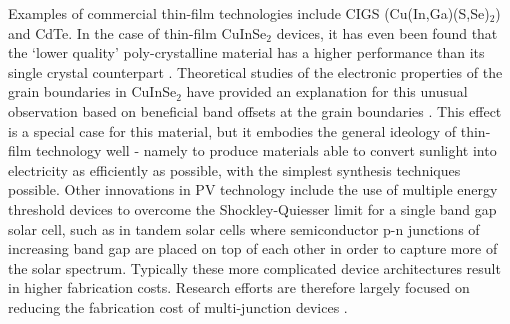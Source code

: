 \documentclass[11pt, twoside]{report}
\begin{document}
Examples of commercial thin-film technologies include CIGS (Cu(In,Ga)(S,Se)$_2$) and CdTe. 
In the case of thin-film CuInSe$_2$ devices, it has even been found that the `lower quality' poly-crystalline material has a higher performance than its single crystal counterpart \cite{CIS1_3, CIS1_4}. Theoretical studies of the electronic properties of the grain boundaries in CuInSe$_2$ have provided an explanation for this unusual observation based on beneficial band offsets at the grain boundaries \cite{CIS1, CIS2}. This effect is a special case for this material, but it embodies the general ideology of thin-film technology well - namely to produce materials able to convert sunlight into electricity as efficiently as possible, with the simplest synthesis techniques possible.
Other innovations in PV technology include the use of multiple energy threshold devices to overcome the Shockley-Quiesser limit \cite{SQ_1961} for a single band gap solar cell, such as in tandem solar cells where semiconductor p-n junctions of increasing band gap are placed on top of each other in order to capture more of the solar spectrum. Typically these more complicated device architectures result in higher fabrication costs. Research efforts are therefore largely focused on reducing the fabrication cost of multi-junction devices \cite{3rd_gen}.

\end{document}
